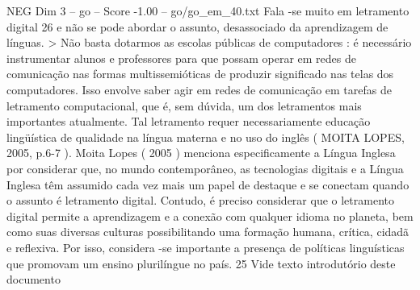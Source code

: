 \begin{textsample}{NEG Dim 3 – go – Score -1.00 – go/go\_em\_40.txt}
Fala -se muito em letramento digital 26 e não se pode abordar o assunto, desassociado da aprendizagem de línguas. > Não basta dotarmos as escolas públicas de computadores : é necessário instrumentar alunos e professores para que possam operar em redes de comunicação nas formas multissemióticas de produzir significado nas telas dos computadores.
Isso envolve saber agir em redes de comunicação em tarefas de letramento computacional, que é, sem dúvida, um dos letramentos mais importantes atualmente.
Tal letramento requer necessariamente educação lingüística de qualidade na língua materna e no uso do inglês ( MOITA LOPES, 2005, p.6-7 ).
Moita Lopes ( 2005 ) menciona especificamente a Língua Inglesa por considerar que, no mundo contemporâneo, as tecnologias digitais e a Língua Inglesa têm assumido cada vez mais um papel de destaque e se conectam quando o assunto é letramento digital.
Contudo, é preciso considerar que o letramento digital permite a aprendizagem e a conexão com qualquer idioma no planeta, bem como suas diversas culturas possibilitando uma formação humana, crítica, cidadã e reflexiva.
Por isso, considera -se importante a presença de políticas linguísticas que promovam um ensino plurilíngue no país. 25 Vide texto introdutório deste documento

\end{textsample}
